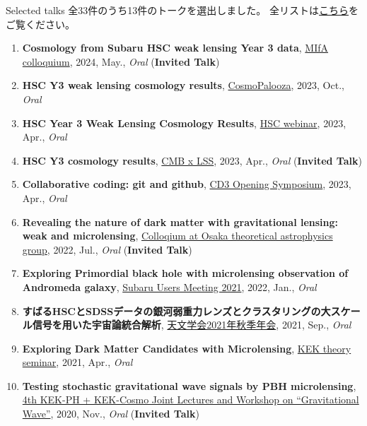 \begin{rSection}{Selected talks}
全33件のうち13件のトークを選出しました。
全リストは\href{https://github.com/git-sunao/cv/blob/main/ja/sunao_type_list.pdf}{こちら}をご覧ください。\begin{enumerate}
\item \textbf{Cosmology from Subaru HSC weak lensing Year 3 data}, \href{https://cse.umn.edu/physics/minnesota-institute-astrophysics-mifa-colloquium}{MIfA colloquium}, 2024, May., \textit{Oral} (\textbf{Invited Talk})
\item \textbf{HSC Y3 weak lensing cosmology results}, \href{http://vietnam.in2p3.fr/2023/windows/index.html}{CosmoPalooza}, 2023, Oct., \textit{Oral}
\item \textbf{HSC Year 3 Weak Lensing Cosmology Results}, \href{https://hsc-release.mtk.nao.ac.jp/doc/index.php/wly3/}{HSC webinar}, 2023, Apr., \textit{Oral}
\item \textbf{HSC Y3 cosmology results}, \href{https://www2.yukawa.kyoto-u.ac.jp/~cmb-lss/index.php}{CMB x LSS}, 2023, Apr., \textit{Oral} (\textbf{Invited Talk})
\item \textbf{Collaborative coding: git and github}, \href{https://cd3.ipmu.jp/opening/}{CD3 Opening Symposium}, 2023, Apr., \textit{Oral}
\item \textbf{Revealing the nature of dark matter with gravitational lensing: weak and microlensing}, \href{http://astro-osaka.jp/OUTAP/colloquium-abstracts.html#sugiyama}{Colloqium at Osaka theoretical astrophysics group}, 2022, Jul., \textit{Oral} (\textbf{Invited Talk})
\item \textbf{Exploring Primordial black hole with microlensing observation of Andromeda galaxy}, \href{https://subarutelescope.org/Science/SubaruUM/SubaruUM2021/}{Subaru Users Meeting 2021}, 2022, Jan., \textit{Oral}
\item \textbf{すばるHSCとSDSSデータの銀河弱重力レンズとクラスタリングの大スケール信号を用いた宇宙論統合解析}, \href{https://www.asj.or.jp/nenkai/archive/2021b/pdf/U05a.pdf}{天文学会2021年秋季年会}, 2021, Sep., \textit{Oral}
\item \textbf{Exploring Dark Matter Candidates with Microlensing}, \href{https://www.kek.jp/ja/conference/20210407-3/}{KEK theory seminar}, 2021, Apr., \textit{Oral}
\item \textbf{Testing stochastic gravitational wave signals by PBH microlensing}, \href{http://conference-indico.kek.jp/event/117/timetable/#day-2020-11-04}{4th KEK-PH + KEK-Cosmo Joint Lectures and Workshop on ``Gravitational Wave''}, 2020, Nov., \textit{Oral} (\textbf{Invited Talk})

\end{enumerate}
\end{rSection}
